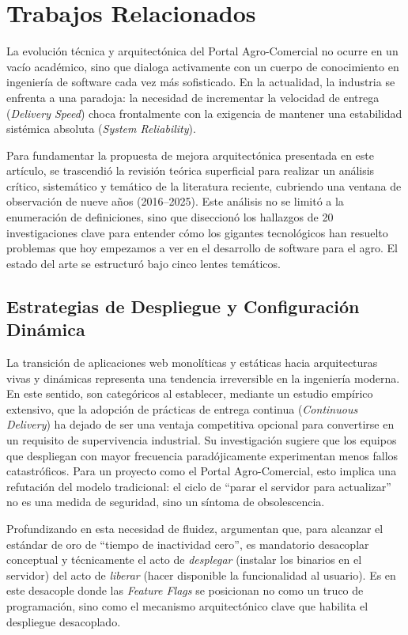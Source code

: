 \section{Trabajos Relacionados}

La evolución técnica y arquitectónica del Portal Agro-Comercial no ocurre en un vacío académico, sino que dialoga activamente con un cuerpo de conocimiento en ingeniería de software cada vez más sofisticado. En la actualidad, la industria se enfrenta a una paradoja: la necesidad de incrementar la velocidad de entrega (\textit{Delivery Speed}) choca frontalmente con la exigencia de mantener una estabilidad sistémica absoluta (\textit{System Reliability}).

Para fundamentar la propuesta de mejora arquitectónica presentada en este artículo, se trascendió la revisión teórica superficial para realizar un análisis crítico, sistemático y temático de la literatura reciente, cubriendo una ventana de observación de nueve años (2016--2025). Este análisis no se limitó a la enumeración de definiciones, sino que diseccionó los hallazgos de 20 investigaciones clave para entender cómo los gigantes tecnológicos han resuelto problemas que hoy empezamos a ver en el desarrollo de software para el agro. El estado del arte se estructuró bajo cinco lentes temáticos.

\subsection{Estrategias de Despliegue y Configuración Dinámica}

La transición de aplicaciones web monolíticas y estáticas hacia arquitecturas vivas y dinámicas representa una tendencia irreversible en la ingeniería moderna. En este sentido, \cite{meyer2016continuous} son categóricos al establecer, mediante un estudio empírico extensivo, que la adopción de prácticas de entrega continua (\textit{Continuous Delivery}) ha dejado de ser una ventaja competitiva opcional para convertirse en un requisito de supervivencia industrial. Su investigación sugiere que los equipos que despliegan con mayor frecuencia paradójicamente experimentan menos fallos catastróficos. Para un proyecto como el Portal Agro-Comercial, esto implica una refutación del modelo tradicional: el ciclo de ``parar el servidor para actualizar'' no es una medida de seguridad, sino un síntoma de obsolescencia.

Profundizando en esta necesidad de fluidez, \cite{ramaswamy2024zerodowntime} argumentan que, para alcanzar el estándar de oro de ``tiempo de inactividad cero'', es mandatorio desacoplar conceptual y técnicamente el acto de \textit{desplegar} (instalar los binarios en el servidor) del acto de \textit{liberar} (hacer disponible la funcionalidad al usuario). Es en este desacople donde las \textit{Feature Flags} se posicionan no como un truco de programación, sino como el mecanismo arquitectónico clave que habilita el despliegue desacoplado.


